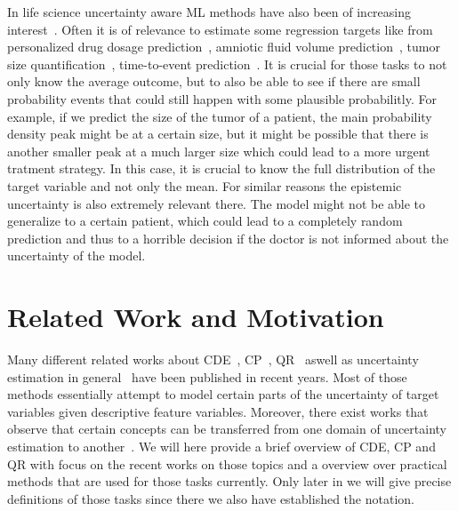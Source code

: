 In life science uncertainty aware ML methods have also been of increasing interest~\cite{loftus2022uncertainty, lambert2024trustworthy}. Often it is of relevance to estimate some regression targets like from personalized drug dosage prediction~\cite{wu2023application}, amniotic fluid volume prediction~\cite{csillag2023amnioml}, tumor size quantification~\cite{prasad2023tumor}, time-to-event prediction~\cite{kvamme2019time, sloma2021empirical}. It is crucial for those tasks to not only know the average outcome, but to also be able to see if there are small probability events that could still happen with some plausible probabilitly. For example, if we predict the size of the tumor of a patient, the main probability density peak might be at a certain size, but it might be possible that there is another smaller peak at a much larger size which could lead to a more urgent tratment strategy. In this case, it is crucial to know the full distribution of the target variable and not only the mean. For similar reasons the epistemic uncertainty is also extremely relevant there. The model might not be able to generalize to a certain patient, which could lead to a completely random prediction and thus to a horrible decision if the doctor is not informed about the uncertainty of the model.

\section{Related Work and Motivation}\label{sec:motivation}

Many different related works about CDE~\cite{bishop1994mixture, rothfuss2019conditional, trippe2018conditional, rothfuss2019noise, ambrogioni2017kernel}, CP~\cite{izbicki2022cd, chernozhukov2021distributional,romano2019conformalized, Papadopoulos08, angelopoulos2021gentle}, QR~\cite{chung2020beyond} aswell as uncertainty estimation in general~\cite{gal_dropout_2016, hullermeier_aleatoric_2021, abdar2021review, klotz2021uncertainty} have been published in recent years. Most of those methods essentially attempt to model certain parts of the uncertainty of target variables given descriptive feature variables. Moreover, there exist works that observe that certain concepts can be transferred from one domain of uncertainty estimation to another~\cite{chernozhukov2021distributional}.
We will here provide a brief overview of CDE, CP and QR with focus on the recent works on those topics and a overview over practical methods that are used for those tasks currently. Only later in  we will give precise definitions of those tasks since there we also have established the notation.

